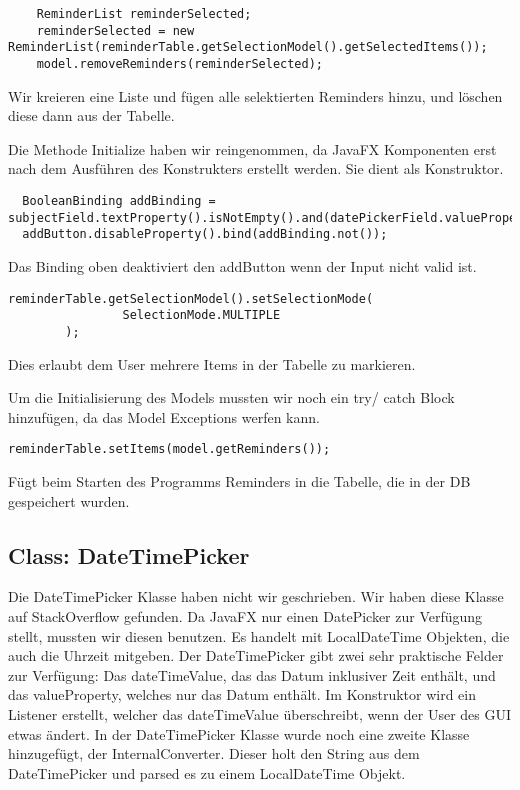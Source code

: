 \begin{lstlisting}
    ReminderList reminderSelected;
    reminderSelected = new ReminderList(reminderTable.getSelectionModel().getSelectedItems());
    model.removeReminders(reminderSelected);
\end{lstlisting}

Wir kreieren eine Liste und fügen alle selektierten Reminders hinzu, und löschen diese dann aus der Tabelle.


Die Methode Initialize haben wir reingenommen, da JavaFX Komponenten erst nach dem Ausführen des Konstrukters erstellt werden. Sie dient als Konstruktor.
\begin{lstlisting}
  BooleanBinding addBinding = subjectField.textProperty().isNotEmpty().and(datePickerField.valueProperty().isNotNull());
  addButton.disableProperty().bind(addBinding.not());
\end{lstlisting}
Das Binding oben deaktiviert den addButton wenn der Input nicht valid ist.

\begin{lstlisting}
reminderTable.getSelectionModel().setSelectionMode(
                SelectionMode.MULTIPLE
        );
\end{lstlisting}
Dies erlaubt dem User mehrere Items in der Tabelle zu markieren.

Um die Initialisierung des Models mussten wir noch ein try/ catch Block hinzufügen, da das Model Exceptions werfen kann.

\begin{lstlisting}
reminderTable.setItems(model.getReminders());
\end{lstlisting}
Fügt beim Starten des Programms Reminders in die Tabelle, die in der DB gespeichert wurden.

\subsection{Class: DateTimePicker}
Die DateTimePicker Klasse haben nicht wir geschrieben. Wir haben diese Klasse auf StackOverflow gefunden. Da JavaFX nur einen DatePicker zur Verfügung stellt, mussten wir diesen benutzen. Es handelt mit LocalDateTime Objekten, die auch die Uhrzeit mitgeben.
Der DateTimePicker gibt zwei sehr praktische Felder zur Verfügung: Das dateTimeValue, das das Datum inklusiver Zeit enthält, und das valueProperty, welches nur das Datum enthält.
Im Konstruktor wird ein Listener erstellt, welcher das dateTimeValue überschreibt, wenn der User des GUI etwas ändert.
In der DateTimePicker Klasse wurde noch eine zweite Klasse hinzugefügt, der InternalConverter. Dieser holt den String aus dem DateTimePicker und parsed es zu einem LocalDateTime
Objekt. 
